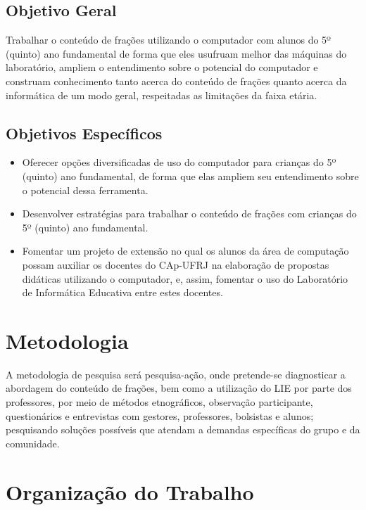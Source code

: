 \subsection{Objetivo Geral}\label{chp:LABEL_CHP_INT_SEC_OBJ_SUBSEC_OBJ_GER}

Trabalhar o conteúdo de frações utilizando o computador com alunos do 5º (quinto) ano fundamental de forma que eles usufruam melhor das máquinas do laboratório, ampliem o entendimento sobre o potencial do computador e construam conhecimento tanto acerca do conteúdo de frações quanto acerca da informática de um modo geral, respeitadas as limitações da faixa etária.

\subsection{Objetivos Específicos}\label{chp:LABEL_CHP_INT_SEC_OBJ_SUBSEC_OBJ_ESP}

\begin{itemize}
\item Oferecer opções diversificadas de uso do computador para crianças do 5º (quinto) ano fundamental, de forma que elas ampliem seu entendimento sobre o potencial dessa ferramenta.

\item Desenvolver estratégias para trabalhar o conteúdo de frações com crianças do 5º (quinto) ano fundamental.

\item Fomentar um projeto de extensão no qual os alunos da área de computação possam auxiliar os docentes do CAp-UFRJ na elaboração de propostas didáticas utilizando o computador, e, assim, fomentar o uso do Laboratório de Informática Educativa entre estes docentes.
\end{itemize}

\section{Metodologia}\label{chp:LABEL_CHP_INT_SEC_MET}

A metodologia de pesquisa será pesquisa-ação, onde pretende-se diagnosticar a abordagem do conteúdo de frações, bem como a utilização do LIE por parte dos professores, por meio de métodos etnográficos, observação participante, questionários e entrevistas com gestores, professores, bolsistas e alunos; pesquisando soluções possíveis que atendam a demandas específicas do grupo e da comunidade.

\section{Organização do Trabalho}\label{chp:LABEL_CHP_INT_SEC_ORG}


